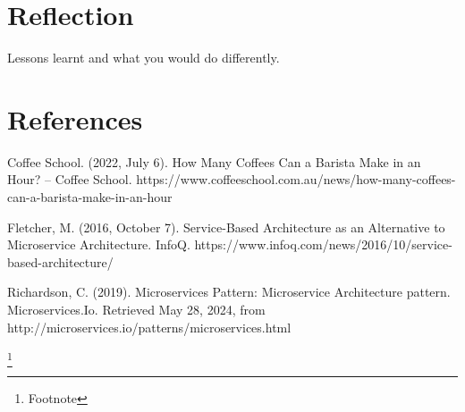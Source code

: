 \documentclass{article}
\begin{document}
\section{Reflection}
Lessons learnt and what you would do differently.

\section{References}
\par \sloppy Coffee School. (2022, July 6). How Many Coffees Can a Barista Make in an Hour? – Coffee School. https://www.coffeeschool.com.au/news/how-many-coffees-can-a-barista-make-in-an-hour
\par Fletcher, M. (2016, October 7). Service-Based Architecture as an Alternative to Microservice Architecture. InfoQ. https://www.infoq.com/news/2016/10/service-based-architecture/
\par Richardson, C. (2019). Microservices Pattern: Microservice Architecture pattern. Microservices.Io. Retrieved May 28, 2024, from http://microservices.io/patterns/microservices.html

\footnote{Footnote}
\end{document}
